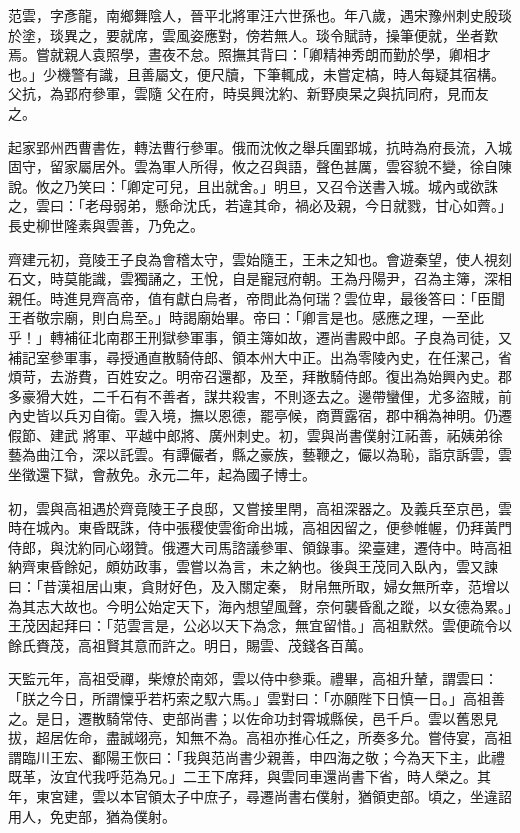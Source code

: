 
\begin{pinyinscope}

 范雲，字彥龍，南鄉舞陰人，晉平北將軍汪六世孫也。年八歲，遇宋豫州刺史殷琰於塗，琰異之，要就席，雲風姿應對，傍若無人。琰令賦詩，操筆便就，坐者歎焉。嘗就親人袁照學，晝夜不怠。照撫其背曰：「卿精神秀朗而勤於學，卿相才也。」少機警有識，且善屬文，便尺牘，下筆輒成，未嘗定槁，時人每疑其宿構。父抗，為郢府參軍，雲隨
 父在府，時吳興沈約、新野庾杲之與抗同府，見而友之。



 起家郢州西曹書佐，轉法曹行參軍。俄而沈攸之舉兵圍郢城，抗時為府長流，入城固守，留家屬居外。雲為軍人所得，攸之召與語，聲色甚厲，雲容貌不變，徐自陳說。攸之乃笑曰：「卿定可兒，且出就舍。」明旦，又召令送書入城。城內或欲誅之，雲曰：「老母弱弟，懸命沈氏，若違其命，禍必及親，今日就戮，甘心如薺。」長史柳世隆素與雲善，乃免之。



 齊建元初，竟陵王子良為會稽太守，雲始隨王，王未之知也。會遊秦望，使人視刻石文，時莫能識，雲獨誦之，王悅，自是寵冠府朝。王為丹陽尹，召為主簿，深相
 親任。時進見齊高帝，值有獻白烏者，帝問此為何瑞？雲位卑，最後答曰：「臣聞王者敬宗廟，則白烏至。」時謁廟始畢。帝曰：「卿言是也。感應之理，一至此乎！」轉補征北南郡王刑獄參軍事，領主簿如故，遷尚書殿中郎。子良為司徒，又補記室參軍事，尋授通直散騎侍郎、領本州大中正。出為零陵內史，在任潔己，省煩苛，去游費，百姓安之。明帝召還都，及至，拜散騎侍郎。復出為始興內史。郡多豪猾大姓，二千石有不善者，謀共殺害，不則逐去之。邊帶蠻俚，尤多盜賊，前內史皆以兵刃自衛。雲入境，撫以恩德，罷亭候，商賈露宿，郡中稱為神明。仍遷假節、建武
 將軍、平越中郎將、廣州刺史。初，雲與尚書僕射江祏善，祏姨弟徐藝為曲江令，深以託雲。有譚儼者，縣之豪族，藝鞭之，儼以為恥，詣京訴雲，雲坐徵還下獄，會赦免。永元二年，起為國子博士。



 初，雲與高祖遇於齊竟陵王子良邸，又嘗接里閈，高祖深器之。及義兵至京邑，雲時在城內。東昏既誅，侍中張稷使雲銜命出城，高祖因留之，便參帷幄，仍拜黃門侍郎，與沈約同心翊贊。俄遷大司馬諮議參軍、領錄事。梁臺建，遷侍中。時高祖納齊東昏餘妃，頗妨政事，雲嘗以為言，未之納也。後與王茂同入臥內，雲又諫曰：「昔漢祖居山東，貪財好色，及入關定秦，
 財帛無所取，婦女無所幸，范增以為其志大故也。今明公始定天下，海內想望風聲，奈何襲昏亂之蹤，以女德為累。」王茂因起拜曰：「范雲言是，公必以天下為念，無宜留惜。」高祖默然。雲便疏令以餘氏賚茂，高祖賢其意而許之。明日，賜雲、茂錢各百萬。



 天監元年，高祖受禪，柴燎於南郊，雲以侍中參乘。禮畢，高祖升輦，謂雲曰：「朕之今日，所謂懍乎若朽索之馭六馬。」雲對曰：「亦願陛下日慎一日。」高祖善之。是日，遷散騎常侍、吏部尚書；以佐命功封霄城縣侯，邑千戶。雲以舊恩見拔，超居佐命，盡誠翊亮，知無不為。高祖亦推心任之，所奏多允。嘗侍宴，高祖
 謂臨川王宏、鄱陽王恢曰：「我與范尚書少親善，申四海之敬；今為天下主，此禮既革，汝宜代我呼范為兄。」二王下席拜，與雲同車還尚書下省，時人榮之。其年，東宮建，雲以本官領太子中庶子，尋遷尚書右僕射，猶領吏部。頃之，坐違詔用人，免吏部，猶為僕射。




\end{pinyinscope}
